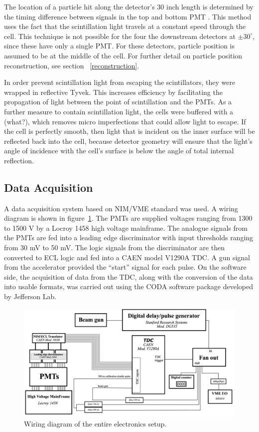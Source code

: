 The location of a particle hit along the detector's 30 inch length is determined by the timing difference between signals in the top and bottom PMT .
This method uses the fact that the scintillation light travels at a constant speed through the cell.
This technique is not possible for the four the downstream detectors at $\pm 30^{\circ}$, since these have only a single PMT.
For these detectors, particle position is assumed to be at the middle of the cell.
For further detail on particle position reconstruction, see section ~\ref{reconstruction}.

In order prevent scintillation light from escaping the scintillators, they were wrapped in reflective Tyvek.
This increases efficiency by facilitating the propagation of light between the point of scintillation and the PMTs.
As a further measure to contain scintillation light, the cells were buffered with a (what?), which removes micro imperfections that could allow light to escape.
If the cell is perfectly smooth, then light that is incident on the inner surface will be reflected back into the cell, because detector geometry will ensure that the light's angle of incidence with the cell's surface is below the angle of total internal reflection.

\subsection{Data Acquisition}
A data acquisition system based on NIM/VME standard was used.
A wiring diagram is shown in figure~\ref{fig:WiringDiagram}.
The PMTs are supplied voltages ranging from 1300 to 1500 V by a Locroy 1458 high voltage mainframe.
The analogue signals from the PMTs are fed into a leading edge discriminator with input thresholds ranging from 30 mV to 50 mV.
The logic signals from the discriminator are then converted to ECL logic and fed into a CAEN model V1290A TDC.
A gun signal from the accelerator provided the “start” signal for each pulse.
On the software side, the acquisition of data from the TDC, along with the conversion of the data into usable formats, was carried out using the CODA software package developed by Jefferson Lab.  

\begin{figure}[h]
\includegraphics[width=\textwidth]{Content/Methods/WiringDiagram.png}
\caption{Wiring diagram of the entire electronics setup. }
\label{fig:WiringDiagram}
\end{figure}
